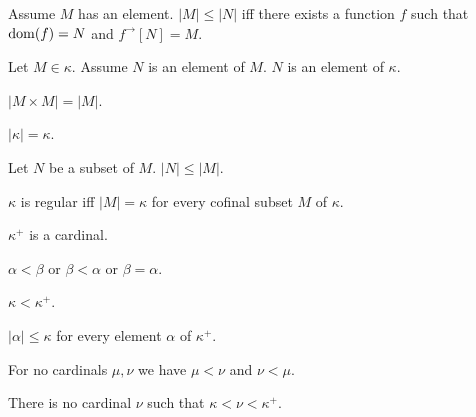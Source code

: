 \documentclass{article}
\newcommand{\Prod}[2]{#1\times #2}
\newcommand{\Succ}[1]{#1^{+}}
\newcommand{\image}[2]{#1^{\to}[#2]}
\newcommand{\card}[1]{\left|#1\right|}
\begin{document}
\begin{forthel}
    \begin{axiom}
      Assume $M$ has an element.
      $\card{M} \leq \card{N}$ iff there exists a function $f$ such that $\operatorname{dom}(f) = N$ and $\image{f}{N} = M$.
    \end{axiom}

    \begin{axiom}[Transitivity]
      Let $M\in \kappa$. Assume $N$ is an element of $M$. $N$ is an element of $\kappa$.
    \end{axiom}

    \begin{axiom}
      $\card{\Prod{M}{M}} = \card{M}$.
    \end{axiom}

    \begin{axiom}
      $\card{\kappa} = \kappa$.
    \end{axiom}

    \begin{axiom}
      Let $N$ be a subset of $M$. $\card{N} \leq \card{M}$.
    \end{axiom}

    \begin{definition}
      $\kappa$ is regular iff $\card{M} = \kappa$ for every cofinal subset $M$ of $\kappa$.
    \end{definition}

    \begin{signature}
      $\Succ{\kappa}$ is a cardinal.
    \end{signature}

    \begin{axiom}
      $\alpha < \beta$ or $\beta < \alpha$ or $\beta = \alpha$.
    \end{axiom}

    \begin{axiom}
      $\kappa < \Succ{\kappa}$.
    \end{axiom}

    \begin{axiom}
      $\card{\alpha} \leq \kappa$ for every element $\alpha$ of $\Succ{\kappa}$.
    \end{axiom}

    \begin{axiom}
      For no cardinals $\mu, \nu$ we have $\mu < \nu$ and $\nu < \mu$.
    \end{axiom}

    \begin{axiom}
      There is no cardinal $\nu$ such that $\kappa < \nu < \Succ{\kappa}$.
    \end{axiom}


\end{forthel}
\end{document}
